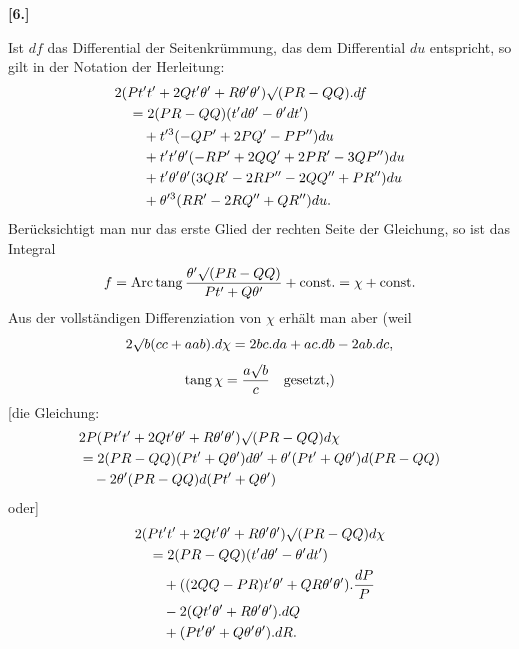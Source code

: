 %
\begin{center}\bfseries [6.]\end{center}
\noindent\hspace*{1.2em}Ist $df$ das Differential der Seitenkrümmung, das dem Differential $du$ entspricht, so gilt in der Notation der Herleitung:
\[
\begin{aligned}
&2(Pt't'+2Qt'\theta'+R\theta'\theta')\mathord{\surd}(PR-QQ).df\\
&\quad=2(PR-QQ)(t'd\theta'-\theta'dt')\\
&\qquad+t'^3(-QP'+2PQ'-PP'')du\\
&\qquad+t't'\theta'(-RP'+2QQ'+2PR'-3QP'')du\\
&\qquad+t'\theta'\theta'(3QR'-2RP''-2QQ''+PR'')du\\
&\qquad+\theta'^3(RR'-2RQ''+QR'')du.
\end{aligned}
\]
Berücksichtigt man nur das erste Glied der rechten Seite der Gleichung, so ist das Integral
\[
f=\operatorname{Arc\,tang}\frac{\theta'\mathord{\surd}(PR-QQ)}{Pt'+Q\theta'}+\text{const.}=\chi+\text{const.}
\]
Aus der vollständigen Differenziation von $\chi$ erhält man aber (weil
\[
2\mathord{\surd}b(cc+aab).d\chi=2bc.da+ac.db-2ab.dc,
\]
\[
\operatorname{tang}\chi=\frac{a\mathord{\surd}b}{c}\quad\text{gesetzt,)}
\]
[die Gleichung:
\[
\begin{aligned}
&2P(Pt't'+2Qt'\theta'+R\theta'\theta')\mathord{\surd}(PR-QQ)d\chi\\
&=2(PR-QQ)(Pt'+Q\theta')d\theta'+\theta'(Pt'+Q\theta')d(PR-QQ)\\
&\quad-2\theta'(PR-QQ)d(Pt'+Q\theta')
\end{aligned}
\]
oder]
\[
\begin{aligned}
&2(Pt't'+2Qt'\theta'+R\theta'\theta')\mathord{\surd}(PR-QQ)d\chi\\
&\quad=2(PR-QQ)(t'd\theta'-\theta'dt')\\
&\qquad+((2QQ-PR)t'\theta'+QR\theta'\theta').\frac{dP}{P}\\
&\qquad-2(Qt'\theta'+R\theta'\theta').dQ\\
&\qquad+(Pt'\theta'+Q\theta'\theta').dR.
\end{aligned}
\]
